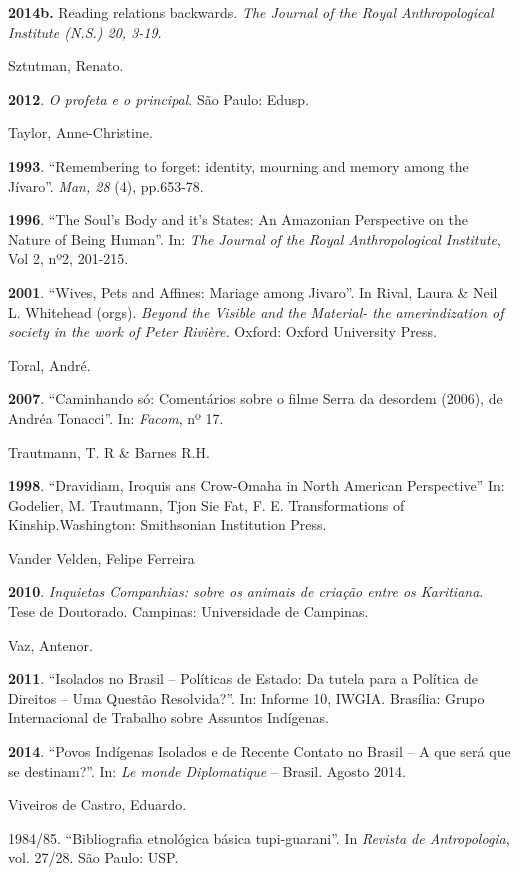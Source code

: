 \textbf{2014b.} Reading relations backwards. \emph{The Journal of the
Royal Anthropological Institute (N.S.) 20, 3-19}.

Sztutman, Renato.

\textbf{2012}. \emph{O profeta e o principal}. São Paulo: Edusp.

Taylor, Anne-Christine.

\textbf{1993}. ``Remembering to forget: identity, mourning and memory
among the Jívaro''. \emph{Man, 28} (4), pp.653-78.

\textbf{1996}. ``The Soul's Body and it's States: An Amazonian
Perspective on the Nature of Being Human''. In: \emph{The} \emph{Journal}
\emph{of the Royal Anthropological Institute}, Vol 2, nº2, 201-215.

\textbf{2001}. ``Wives, Pets and Affines: Mariage among Jivaro''. In
Rival, Laura \& Neil L. Whitehead (orgs). \emph{Beyond the Visible and
the Material- the amerindization of society in the work of Peter
Rivière.} Oxford: Oxford University Press.

Toral, André.

\textbf{2007}. ``Caminhando só: Comentários sobre o filme Serra da
desordem (2006), de Andréa Tonacci''. In: \emph{Facom}, nº 17.

Trautmann, T. R \& Barnes R.H.

\textbf{1998}. ``Dravidiam, Iroquis ans Crow-Omaha in North American
Perspective'' In: Godelier, M. Trautmann, Tjon Sie Fat, F. E.
Transformations of Kinship.Washington: Smithsonian Institution Press.

Vander Velden, Felipe Ferreira

\textbf{2010}. \emph{Inquietas Companhias: sobre os animais de criação
entre os Karitiana}. Tese de Doutorado. Campinas: Universidade de
Campinas.

Vaz, Antenor.

\textbf{2011}. ``Isolados no Brasil -- Políticas de Estado: Da tutela
para a Política de Direitos -- Uma Questão Resolvida?''. In: Informe 10,
IWGIA. Brasília: Grupo Internacional de Trabalho sobre Assuntos
Indígenas.

\textbf{2014}. ``Povos Indígenas Isolados e de Recente Contato no Brasil
-- A que será que se destinam?''. In: \emph{Le monde Diplomatique} --
Brasil. Agosto 2014.

Viveiros de Castro, Eduardo.

1984/85. ``Bibliografia etnológica básica tupi-guarani''. In
\emph{Revista de Antropologia}, vol. 27/28. São Paulo: USP.

